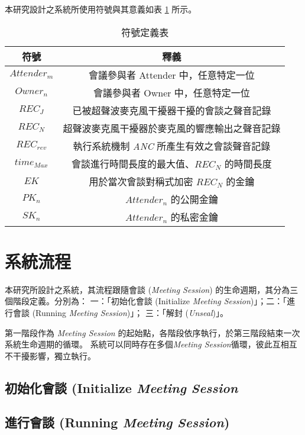     本研究設計之系統所使用符號與其意義如表 \ref{table:tab.symbol} 所示。

\begin{table}[H]
    \centering
    \caption{符號定義表}
    \label{table:tab.symbol}
    \begin{tabular}{ c c }
        \hline
        \bf{符號} & \bf{釋義} \\
        \hline
        $Attender_{m}$ & 會議參與者 Attender 中，任意特定一位 \\
        $Owner_{n}$    & 會議參與者 Owner 中，任意特定一位 \\
        $REC_{J}$      & 已被超聲波麥克風干擾器干擾的會談之聲音記錄 \\
        $REC_{N}$      & 超聲波麥克風干擾器於麥克風的響應輸出之聲音記錄 \\
        $REC_{rev}$    & 執行系統機制 {\it ANC} 所產生有效之會談聲音記錄 \\
        $time_{Max}$   & 會談進行時間長度的最大值、$REC_{N}$ 的時間長度 \\
        $EK$           & 用於當次會談對稱式加密 $REC_{N}$ 的金鑰 \\
        $PK_{n}$       & $Attender_{n}$ 的公開金鑰 \\
        $SK_{n}$       & $Attender_{n}$ 的私密金鑰 \\

    \end{tabular}
\end{table}


\section{系統流程}

    本研究所設計之系統，其流程跟隨會談 ({\it Meeting Session}) 的生命週期，其分為三個階段定義。分別為：
一：「初始化會談 (Initialize {\it Meeting Session})」；二：「進行會談 (Running {\it Meeting Session})」；
三：「解封 ({\it Unseal})」。

    第一階段作為 {\it Meeting Session} 的起始點，各階段依序執行，於第三階段結束一次系統生命週期的循環。
系統可以同時存在多個{\it Meeting Session}循環，彼此互相互不干擾影響，獨立執行。


\subsection{初始化會談 (Initialize {\it Meeting Session}}


\subsection{進行會談 (Running {\it Meeting Session})}


